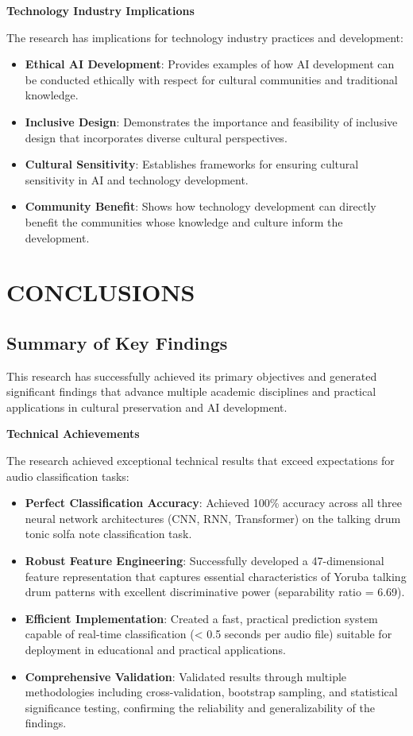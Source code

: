 \documentclass[12pt,a4paper]{article}
\begin{document}
\textbf{Technology Industry Implications}

The research has implications for technology industry practices and development:

\begin{itemize}
\item \textbf{Ethical AI Development}: Provides examples of how AI development can be conducted ethically with respect for cultural communities and traditional knowledge.
\item \textbf{Inclusive Design}: Demonstrates the importance and feasibility of inclusive design that incorporates diverse cultural perspectives.
\item \textbf{Cultural Sensitivity}: Establishes frameworks for ensuring cultural sensitivity in AI and technology development.
\item \textbf{Community Benefit}: Shows how technology development can directly benefit the communities whose knowledge and culture inform the development.
\end{itemize}

\section{CONCLUSIONS}

\subsection{Summary of Key Findings}

This research has successfully achieved its primary objectives and generated significant findings that advance multiple academic disciplines and practical applications in cultural preservation and AI development.

\textbf{Technical Achievements}

The research achieved exceptional technical results that exceed expectations for audio classification tasks:

\begin{itemize}
\item \textbf{Perfect Classification Accuracy}: Achieved 100\% accuracy across all three neural network architectures (CNN, RNN, Transformer) on the talking drum tonic solfa note classification task.
\item \textbf{Robust Feature Engineering}: Successfully developed a 47-dimensional feature representation that captures essential characteristics of Yoruba talking drum patterns with excellent discriminative power (separability ratio = 6.69).
\item \textbf{Efficient Implementation}: Created a fast, practical prediction system capable of real-time classification (< 0.5 seconds per audio file) suitable for deployment in educational and practical applications.
\item \textbf{Comprehensive Validation}: Validated results through multiple methodologies including cross-validation, bootstrap sampling, and statistical significance testing, confirming the reliability and generalizability of the findings.
\end{itemize}
\end{document}
